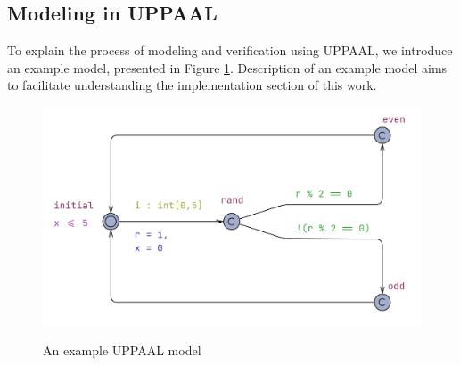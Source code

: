 \subsection{Modeling in UPPAAL}
To explain the process of modeling and verification using UPPAAL, we introduce an example model, presented in Figure \ref{fig:automaton_example}. Description of an example model aims to facilitate understanding the implementation section of this work.
\begin{figure}[H]
\caption{An example UPPAAL model}
\includegraphics[width=\textwidth]{images/automaton_example.png}
\label{fig:automaton_example}
\end{figure}
\noindent
